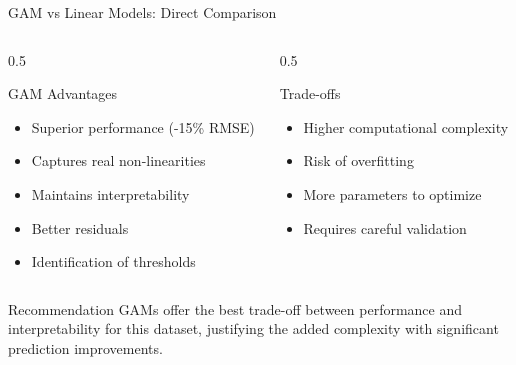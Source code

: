 \documentclass{beamer}
\begin{document}
\begin{frame}{GAM vs Linear Models: Direct Comparison}
    \begin{columns}
        \begin{column}{0.5\textwidth}
            \begin{block}{GAM Advantages}
                \begin{itemize}
                    \item Superior performance (-15\% RMSE)
                    \item Captures real non-linearities
                    \item Maintains interpretability
                    \item Better residuals
                    \item Identification of thresholds
                \end{itemize}
            \end{block}
        \end{column}
        
        \begin{column}{0.5\textwidth}
            \begin{block}{Trade-offs}
                \begin{itemize}
                    \item Higher computational complexity
                    \item Risk of overfitting
                    \item More parameters to optimize
                    \item Requires careful validation
                \end{itemize}
            \end{block}
        \end{column}
    \end{columns}
    \vspace{0.5cm}
    \begin{alertblock}{Recommendation}
        GAMs offer the best trade-off between performance and interpretability for this dataset, justifying the added complexity with significant prediction improvements.
    \end{alertblock}
\end{frame}

\end{document}
